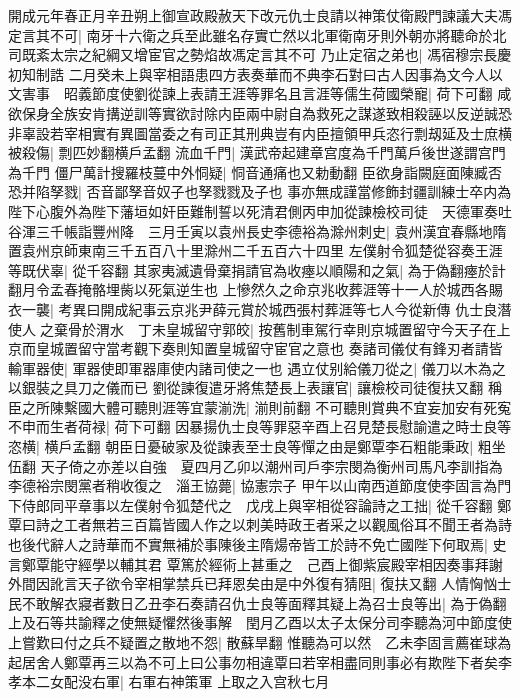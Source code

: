 開成元年春正月辛丑朔上御宣政殿赦天下改元仇士良請以神策仗衛殿門諫議大夫馮定言其不可|{
	南牙十六衛之兵至此雖名存實亡然以北軍衛南牙則外朝亦將聽命於北司既紊太宗之紀綱又增宦官之勢焰故馮定言其不可}
乃止定宿之弟也|{
	馮宿穆宗長慶初知制誥}
二月癸未上與宰相語患四方表奏華而不典李石對曰古人因事為文今人以文害事　昭義節度使劉從諫上表請王涯等罪名且言涯等儒生荷國榮寵|{
	荷下可翻}
咸欲保身全族安肯搆逆訓等實欲討除内臣兩中尉自為救死之謀遂致相殺誣以反逆誠恐非辜設若宰相實有異圖當委之有司正其刑典豈有内臣擅領甲兵恣行剽刼延及士庶横被殺傷|{
	剽匹妙翻横戶孟翻}
流血千門|{
	漢武帝起建章宫度為千門萬戶後世遂謂宫門為千門}
僵尸萬計搜羅枝蔓中外恫疑|{
	恫音通痛也又勅動翻}
臣欲身詣闕庭面陳臧否恐并陷孥戮|{
	否音鄙孥音奴子也孥戮戮及子也}
事亦無成謹當修飾封疆訓練士卒内為陛下心腹外為陛下藩垣如奸臣難制誓以死清君側丙申加從諫檢校司徒　天德軍奏吐谷渾三千帳詣豐州降　三月壬寅以袁州長史李德裕為滁州刺史|{
	袁州漢宜春縣地隋置袁州京師東南三千五百八十里滁州二千五百六十四里}
左僕射令狐楚從容奏王涯等既伏辜|{
	從千容翻}
其家夷滅遺骨棄捐請官為收瘞以順陽和之氣|{
	為于偽翻瘞於計翻月令孟春掩骼埋胔以死氣逆生也}
上慘然久之命京兆收葬涯等十一人於城西各賜衣一襲|{
	考異曰開成紀事云京兆尹薛元賞於城西張村葬涯等七人今從新傳}
仇士良潛使人之棄骨於渭水　丁未皇城留守郭皎|{
	按舊制車駕行幸則京城置留守今天子在上京而皇城置留守當考觀下奏則知置皇城留守宦官之意也}
奏諸司儀仗有鋒刃者請皆輸軍器使|{
	軍器使即軍器庫使内諸司使之一也}
遇立仗别給儀刀從之|{
	儀刀以木為之以銀裝之具刀之儀而已}
劉從諫復遣牙將焦楚長上表讓官|{
	讓檢校司徒復扶又翻}
稱臣之所陳繫國大體可聽則涯等宜蒙湔洗|{
	湔則前翻}
不可聽則賞典不宜妄加安有死寃不申而生者荷禄|{
	荷下可翻}
因暴揚仇士良等罪惡辛酉上召見楚長慰諭遣之時士良等恣横|{
	横戶孟翻}
朝臣日憂破家及從諫表至士良等憚之由是鄭覃李石粗能秉政|{
	粗坐伍翻}
天子倚之亦差以自強　夏四月乙卯以潮州司戶李宗閔為衡州司馬凡李訓指為李德裕宗閔黨者稍收復之　淄王協薨|{
	協憲宗子}
甲午以山南西道節度使李固言為門下侍郎同平章事以左僕射令狐楚代之　戊戌上與宰相從容論詩之工拙|{
	從千容翻}
鄭覃曰詩之工者無若三百篇皆國人作之以刺美時政王者采之以觀風俗耳不聞王者為詩也後代辭人之詩華而不實無補於事陳後主隋煬帝皆工於詩不免亡國陛下何取焉|{
	史言鄭覃能守經學以輔其君}
覃篤於經術上甚重之　己酉上御紫宸殿宰相因奏事拜謝外間因訛言天子欲令宰相掌禁兵已拜恩矣由是中外復有猜阻|{
	復扶又翻}
人情恟忷士民不敢解衣寢者數日乙丑李石奏請召仇士良等面釋其疑上為召士良等出|{
	為于偽翻}
上及石等共諭釋之使無疑懼然後事解　閏月乙酉以太子太保分司李聽為河中節度使上嘗歎曰付之兵不疑置之散地不怨|{
	散蘇旱翻}
惟聽為可以然　乙未李固言薦崔球為起居舍人鄭覃再三以為不可上曰公事勿相違覃曰若宰相盡同則事必有欺陛下者矣李孝本二女配没右軍|{
	右軍右神策軍}
上取之入宫秋七月

